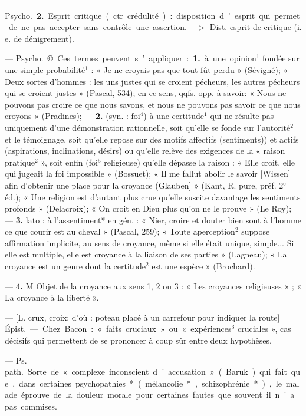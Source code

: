 \begin{itemize}[leftmargin=1cm, label=, itemsep=11pt]
— \si{Psycho.}  {\bf 2.} Esprit critique (ctr.
crédulité) : disposition d'esprit qui
permet de ne pas accepter sans contrôle une assertion. $->$ Dist. esprit
de critique (i. e. de dénigrement).

 — \si{Psycho.} © Ces
termes peuvent s’appliquer : {\bf 1.} à
une opinion$^1$ fondée sur une simple
probabilité$^1$ : « Je ne croyais pas que
tout fût perdu » (Sévigné); « Deux
sortes d'hommes : les uns justes qui
se croient pécheurs, les autres pécheurs qui se croient justes » (Pascal,
534); en ce sens, qqfs. opp. à savoir:
« Nous ne pouvons pas croire ce que
nous savons, et nous ne pouvons
pas savoir ce que nous croyons »
(Pradines); —  {\bf 2.} (syn. : foi$^4$) à une
certitude$^1$ qui ne résulte pas uniquement d'une démonstration rationnelle, soit qu’elle se fonde sur l’autorité$^2$ et le témoignage, soit qu'elle
repose sur des motifs affectifs (sentiments)) et actifs (aspirations, inclinations, désirs) ou qu'elle relève des
exigences de la « raison pratique$^2$ »,
soit enfin (foi$^5$ religieuse) qu’elle
dépasse la raison : « Elle croit, elle
qui jugeait la foi impossible »
(Bossuet); « Il me fallut abolir le
savoir [Wissen] afin d'obtenir une
place pour la croyance (Glauben] »
(Kant, R. pure, préf. 2$^\text{e}$ éd.); « Une
religion est d’autant plus crue qu’elle
suscite davantage les sentiments
profonds » (Delacroix); « On croit en
Dieu plus qu’on ne le prouve » (Le
Roy); —  {\bf 3.} lato : à l'assentiment* en
gén. : « Nier, croire et douter bien
sont à l’homme ce que courir est au
cheval » (Pascal, 259); « Toute aperception$^2$ suppose affirmation implicite, au sens de croyance, même si
elle était unique, simple... Si elle
est multiple, elle est croyance à la
liaison de ses parties » (Lagneau);
« La croyance est un genre dont
la certitude$^2$ est une espèce » (Brochard).

—  {\bf 4.} M Objet de la croyance aux
sens 1, 2 ou 3 : « Les croyances religieuses » ; « La croyance à la liberté ».

 — [L. crux, croix; d’où : poteau
placé à un carrefour pour indiquer
la route] \si{Épist.} — Chez Bacon :
« faits cruciaux » ou « expériences$^3$
cruciales », cas décisifs qui permettent de se prononcer à coup sûr entre
deux hypothèses.

 — \si{Ps. path.} Sorte de « complexe inconscient
d’accusation » (Baruk) qui fait que,
dans certaines psychopathies* (mélancolie*, schizophrénie*), le malade
éprouve de la douleur morale pour
certaines fautes que souvent il n’a
pas commises.


\end{itemize}
